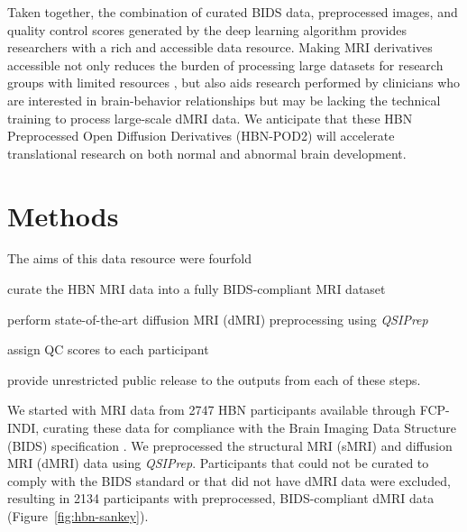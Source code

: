 \documentclass[fleqn,10pt,inline]{wlscirep}
\begin{document}
Taken together, the combination of curated BIDS data, preprocessed images, and quality control scores generated by the deep learning algorithm provides researchers with a rich and accessible data resource. Making MRI derivatives accessible not only reduces the burden of processing large datasets for research groups with limited resources \cite{laird2021large}, but also aids research performed by clinicians who are interested in brain-behavior relationships but may be lacking the technical training to process large-scale dMRI data. We anticipate that these HBN Preprocessed Open Diffusion Derivatives (HBN-POD2) will accelerate translational research on both normal and abnormal brain development.

\section*{Methods}

The aims of this data resource were fourfold
\begin{enumerate*}[%
    label=(\roman*),%
    before=\unskip{: },%
    itemjoin={{, }},%
    itemjoin*={{, and }}]
    \item curate the HBN MRI data into a fully BIDS-compliant MRI dataset
    \item perform state-of-the-art diffusion MRI (dMRI) preprocessing using \emph{QSIPrep}
    \item assign QC scores to each participant
    \item provide unrestricted public release to the outputs from each of these
    steps.
\end{enumerate*}
We started with MRI data from \num{2747} HBN participants available through FCP-INDI,
curating these data for compliance with the Brain Imaging Data Structure
(BIDS) specification \cite{gorgolewski2016-lh}. We  preprocessed the structural
MRI (sMRI) and diffusion MRI (dMRI) data using \emph{QSIPrep}. Participants that
could not be curated to comply with the BIDS standard or that did not have dMRI
data were excluded, resulting in \num{2134} participants with preprocessed,
BIDS-compliant dMRI data (Figure~\ref{fig:hbn-sankey}).
\end{document}
